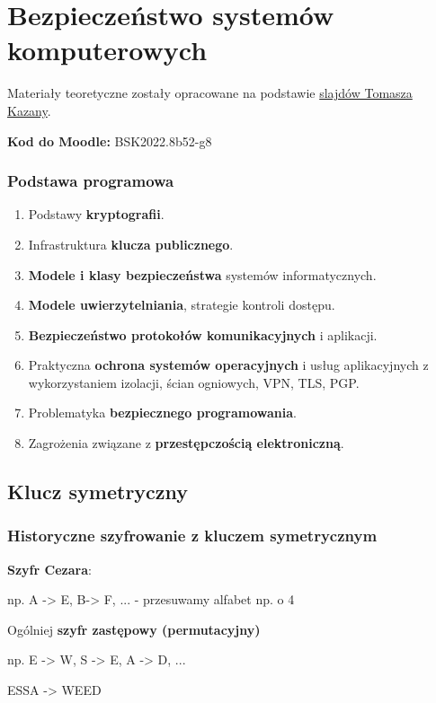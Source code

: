 \chapter{Bezpieczeństwo systemów komputerowych}

Materiały teoretyczne zostały opracowane na podstawie \href{https://moodle.mimuw.edu.pl/course/view.php?id=1490}{slajdów Tomasza Kazany}.

\textbf{Kod do Moodle:} BSK2022.8b52-g8

\subsection{Podstawa programowa}
\begin{enumerate}
    \item Podstawy \textbf{kryptografii}.
    \item Infrastruktura \textbf{klucza publicznego}.
    \item \textbf{Modele i klasy bezpieczeństwa} systemów informatycznych.
    \item \textbf{Modele uwierzytelniania}, strategie kontroli dostępu.
    \item \textbf{Bezpieczeństwo protokołów komunikacyjnych} i aplikacji.
    \item Praktyczna \textbf{ochrona systemów operacyjnych} i usług aplikacyjnych z wykorzystaniem izolacji, ścian ogniowych, VPN, TLS, PGP.
    \item Problematyka \textbf{bezpiecznego programowania}.
    \item Zagrożenia związane z \textbf{przestępczością elektroniczną}.
\end{enumerate}

\section{Klucz symetryczny}

\subsection{Historyczne szyfrowanie z kluczem symetrycznym}

\textbf{Szyfr Cezara}:

np. A -> E, B-> F, ... - przesuwamy alfabet np. o 4

Ogólniej \textbf{szyfr zastępowy (permutacyjny)}

np. E -> W, S -> E, A -> D, ...

ESSA -> WEED

